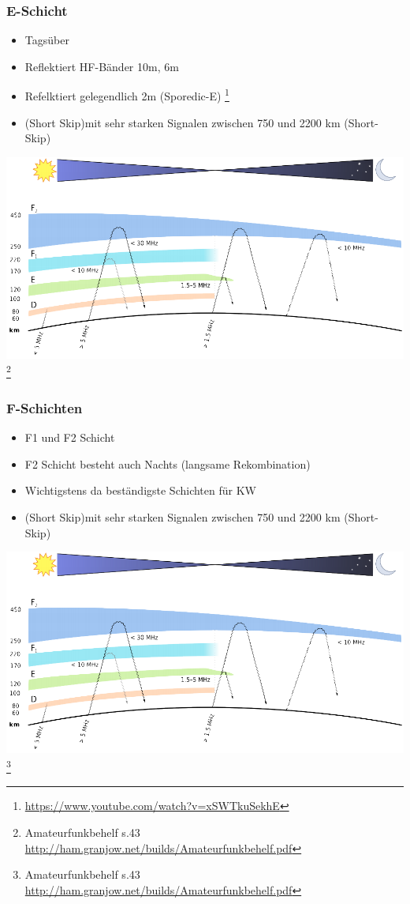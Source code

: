\begin{frame}
    \frametitle{E-Schicht}
    \begin{itemize}
    			\item Tagsüber
				\item Reflektiert HF-Bänder 10m, 6m
       		 	\item Refelktiert gelegendlich 2m (Sporedic-E) \footnote{\tiny \url{https://www.youtube.com/watch?v=xSWTkuSekhE}}
       		 	\item (Short Skip)mit sehr starken Signalen zwischen 750 und 2200 km (Short-Skip)
    \end{itemize}
    \begin{center}
        \includegraphics[width=.75\textwidth]{e09/schichten_behelf_43.png}
        \footnote{\tiny Amateurfunkbehelf s.43 \url{http://ham.granjow.net/builds/Amateurfunkbehelf.pdf}}
    \end{center}
\end{frame}

\begin{frame}
    \frametitle{F-Schichten}
    \begin{itemize}
    			\item F1 und F2 Schicht
				\item F2 Schicht besteht auch Nachts (langsame Rekombination)
       		 	\item Wichtigstens da beständigste Schichten für KW
       		 	\item (Short Skip)mit sehr starken Signalen zwischen 750 und 2200 km (Short-Skip)
    \end{itemize}
	\begin{center}
        \includegraphics[width=.75\textwidth]{e09/schichten_behelf_43.png}
        \footnote{\tiny Amateurfunkbehelf s.43 \url{http://ham.granjow.net/builds/Amateurfunkbehelf.pdf}}
    \end{center}
\end{frame}

